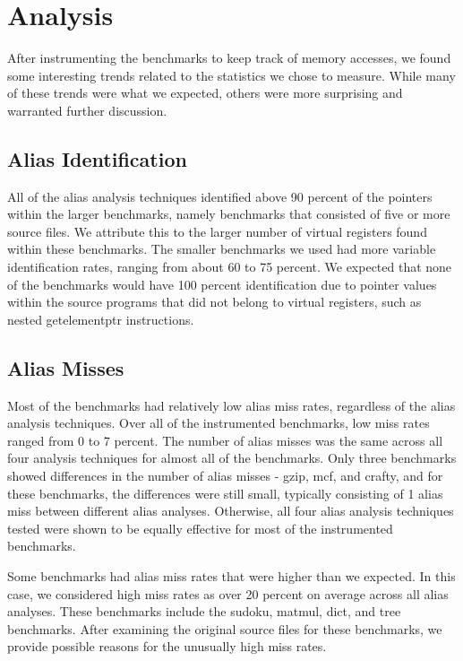 \chapter{Analysis}

After instrumenting the benchmarks to keep track of memory accesses, we found some interesting trends related to the statistics we chose to measure. While many of these trends were what we expected, others were more surprising and warranted further discussion.

\section{Alias Identification}
All of the alias analysis techniques identified above 90 percent of the pointers within the larger benchmarks, namely benchmarks that consisted of five or more source files. We attribute this to the larger number of virtual registers found within these benchmarks. The smaller benchmarks we used had more variable identification rates, ranging from about 60 to 75 percent. We expected that none of the benchmarks would have 100 percent identification due to pointer values within the source programs that did not belong to virtual registers, such as nested getelementptr instructions.

\section{Alias Misses}
Most of the benchmarks had relatively low alias miss rates, regardless of the alias analysis techniques. Over all of the instrumented benchmarks, low miss rates ranged from 0 to 7 percent. The number of alias misses was the same across all four analysis techniques for almost all of the benchmarks. Only three benchmarks showed differences in the number of alias misses - gzip, mcf, and crafty, and for these benchmarks, the differences were still small, typically consisting of 1 alias miss between different alias analyses. Otherwise, all four alias analysis techniques tested were shown to be equally effective for most of the instrumented benchmarks.

Some benchmarks had alias miss rates that were higher than we expected. In this case, we considered high miss rates as over 20 percent on average across all alias analyses. These benchmarks include the sudoku, matmul, dict, and tree benchmarks. After examining the original source files for these benchmarks, we provide possible reasons for the unusually high miss rates.

